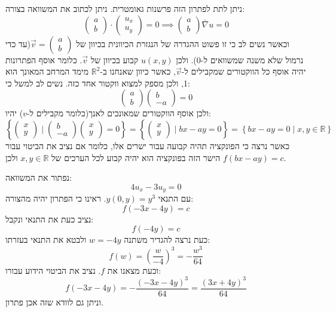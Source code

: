 \documentclass{tstextbook}
\begin{document}
\begin{remark}
ניתן לתת לפתרון הזה פרשנות גאומטרית. ניתן לכתוב את המשוואה בצורה:
$$\begin{pmatrix}a \\ b\end{pmatrix}\cdot \begin{pmatrix}u_{x}\\u_{y}\end{pmatrix}=0\implies \begin{pmatrix} a \\ b
\end{pmatrix}\bar{\nabla}  u =0$$
וכאשר נשים לב כי זו פשוט ההגדרה של הנגזרת הכיוונית בכיוון של \(\vec{v}=\begin{pmatrix}a \\ b\end{pmatrix}\)(עד כדי נרמול שלא משנה שמשוואים ל-0). ולכן \(u(x,y)\) קבוע בכיוון של \(\vec{v}\). כלומר אוסף הפתרונות יהיה אוסף כל הווקטורים שמקבילים ל-\(\vec{v}\), כאשר כיוון שאנחנו ב-\(\mathbb{R}^{2}\) מימד המרחב המאונך הוא 1, ולכן מספק למצוא ווקטור אחד כזה. נשים לב למשל כי:
$$\begin{pmatrix}a \\b\end{pmatrix}\begin{pmatrix}b \\ -a
\end{pmatrix}=0$$
ולכן אוסף הווקטורים שמאונכים לאנך(כלומר מקבילים ל-\(v\)) יהיו:
$$\left\{  \begin{pmatrix}x\\y\end{pmatrix}\mid \begin{pmatrix}b \\ -a\end{pmatrix}\begin{pmatrix}x\\y\end{pmatrix}=0  \right\}=\left\{  \begin{pmatrix}x\\y
\end{pmatrix}\mid bx-ay=0  \right\}=\left\{  bx-ay=0\mid x,y \in \mathbb{R}  \right\}$$
כאשר נרצה כי הפונקציה תהיה קבועה עבור ישרים אלו, כלומר אם נציב את הביטוי עבור הישר הזה בפונקציה הוא יהיה קבוע לכל הערכים של \(x,y \in \mathbb{R}\) ולכן \(f(bx-ay)=c\).

\end{remark}
\begin{example}
נפתור את המשוואה:
$$4u_{x}-3u_{y}=0$$
עם התנאי \(y(0,y)=y^{3}\). ראינו כי הפתרון יהיה מהצורה:
$$f(-3x-4y)=c$$
נציב כעת את התנאי ונקבל:
$$f(-4y)=c$$
כעת נרצה להגדיר משתנה \(w=-4y\) ולבטא את התנאי בעזרתו:
$$f(w)=\left( \frac{w}{-4} \right)^{3}=-\frac{w^{3}}{64}$$
וכעת מצאנו את \(f\). נציב את הביטוי הידוע עבורו:
$$f(-3x-4y)=- \frac{(-3x-4y)^{3}}{64}=\frac{(3x+4y)^{3}}{64}$$
וניתן גם לוודא שזה אכן פתרון.

\end{example}
\end{document}
